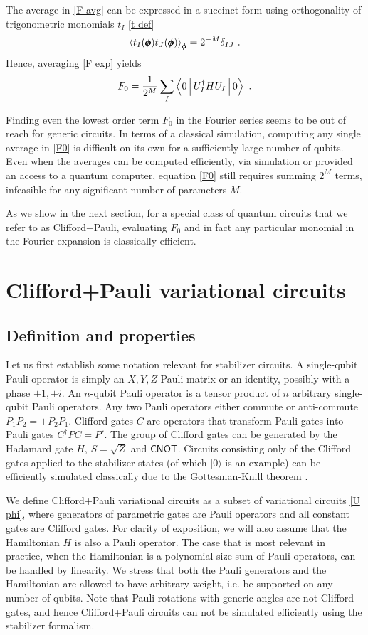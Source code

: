\documentclass[twocolumn, amsfonts, amssymb, aps, nofootinbib]{revtex4-2}
\newcommand{\CX}{\textsf{CNOT}}
\newcommand{\CP}{Clifford+Pauli}
\begin{document}
The average in \eqref{F avg} can be expressed in a succinct form using orthogonality of trigonometric monomials $t_I$ \eqref{t def}  
\begin{align}
	\Braket{t_I(\pmb\phi) t_J(\pmb\phi)}_{\pmb\phi}=2^{-M}\delta_{IJ} \ . \label{t product}
\end{align}
Hence, averaging \eqref{F exp} yields
\begin{align}
	F_0=\frac{1}{2^M}\sum_{I}\Braket{0|U_I^\dagger H U_I|0} \ . \label{F0}
\end{align}

Finding even the lowest order term $F_0$ in the Fourier series seems to be out of reach for generic circuits. In terms of a classical simulation, computing any single average in \eqref{F0} is difficult on its own for a sufficiently large number of qubits. Even when the averages can be computed efficiently, via simulation or provided an access to a quantum computer, equation \eqref{F0} still requires summing $2^M$ terms, infeasible for any significant number of parameters $M$.

As we show in the next section, for a special class of quantum circuits that we refer to as \CP{}, evaluating $F_0$ and in fact any particular monomial in the Fourier expansion is classically efficient. 
\section{\CP{} variational circuits}
\subsection{Definition and properties}
Let us first establish some notation relevant for stabilizer circuits. A single-qubit Pauli operator is simply an $X, Y, Z$ Pauli matrix or an identity, possibly with a phase $\pm1, \pm i$. An $n$-qubit Pauli operator is a tensor product of $n$ arbitrary single-qubit Pauli operators. Any two Pauli operators either commute or anti-commute $P_1P_2=\pm P_2P_1$. Clifford gates $C$ are operators that transform Pauli gates into Pauli gates $C^\dagger P C=P'$. The group of Clifford gates can be generated by the Hadamard gate $H$, $S=\sqrt{Z}$ and $\CX{}$. Circuits consisting only of the Clifford gates applied to the stabilizer states (of which $|0\rangle$ is an example) can be efficiently simulated classically due to the Gottesman-Knill theorem \cite{Aaronson2004}.

We define \CP{} variational circuits as a subset of variational circuits \eqref{U phi}, where generators of parametric gates are Pauli operators and all constant gates are Clifford gates. For clarity of exposition, we will also assume that the Hamiltonian $H$ is also a Pauli operator. The case that is most relevant in practice, when the Hamiltonian is a polynomial-size sum of Pauli operators, can be handled by linearity. We stress that both the Pauli generators and the Hamiltonian are allowed to have arbitrary weight, i.e. be supported on any number of qubits.
Note that Pauli rotations with generic angles are not Clifford gates, and hence \CP{} circuits can not be simulated efficiently using the stabilizer formalism. 
\end{document}
